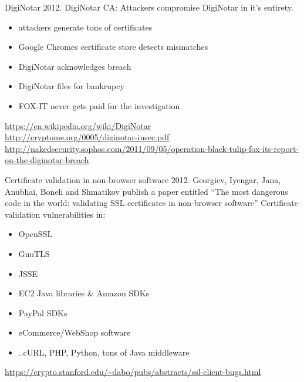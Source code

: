 \begin{frame}{DigiNotar}
  2012. DigiNotar CA: Attackers compromise DigiNotar in it's entirety.

  \begin{itemize}
    \item attackers generate tons of certificates
    \item Google Chromes certificate store detects mismatches
    \item DigiNotar acknowledges breach
    \item DigiNotar files for bankrupcy
    \item FOX-IT never gets paid for the investigation
  \end{itemize}


  \vspace{30px}

  \tiny
  \url{https://en.wikipedia.org/wiki/DigiNotar}\\
  \url{http://cryptome.org/0005/diginotar-insec.pdf}\\
  \url{http://nakedsecurity.sophos.com/2011/09/05/operation-black-tulip-fox-its-report-on-the-diginotar-breach}\

\end{frame}

\begin{frame}{Certificate validation in non-browser software}
  2012. Georgiev, Iyengar, Jana, Anubhai, Boneh and Shmatikov publish a paper entitled ``The most dangerous code in the world: validating SSL certificates in non-browser software''
  \newline
  \newline
  Certificate validation vulnerabilities in:
  \begin{itemize}
    \item OpenSSL
    \item GnuTLS
    \item JSSE
    \item EC2 Java libraries \& Amazon SDKs
    \item PayPal SDKs
    \item eCommerce/WebShop software
    \item ..cURL, PHP, Python, tons of Java middleware
  \end{itemize}

  \tiny
  \url{https://crypto.stanford.edu/~dabo/pubs/abstracts/ssl-client-bugs.html}
\end{frame}

